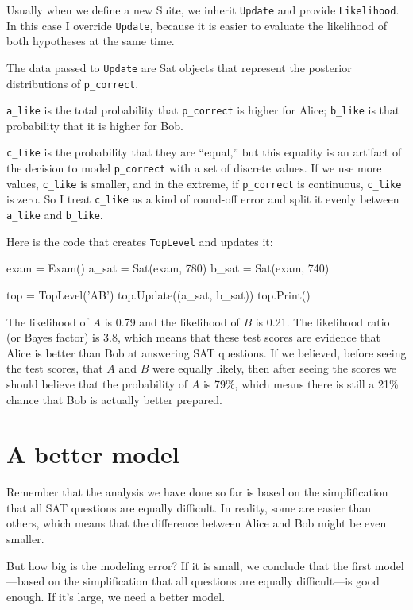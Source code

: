 \documentclass[12pt]{book}
\theoremstyle{exercise}
\begin{document}
Usually when we define a new Suite, we inherit {\tt Update}
and provide {\tt Likelihood}.  In this case I override {\tt Update},
because it is easier to evaluate the likelihood of both
hypotheses at the same time.

The data passed to {\tt Update} are Sat objects that represent
the posterior distributions of \verb"p_correct".

\verb"a_like" is the total probability that
\verb"p_correct" is higher for Alice; \verb"b_like" is that
probability that it is higher for Bob.

\verb"c_like" is the probability that they are ``equal,'' but this
equality is an artifact of the decision to model \verb"p_correct" with
a set of discrete values.  If we use more values, \verb"c_like"
is smaller, and in the extreme, if \verb"p_correct" is
continuous, \verb"c_like" is zero.  So I treat \verb"c_like" as
a kind of round-off error and split it evenly between \verb"a_like"
and \verb"b_like".

Here is the code that creates {\tt TopLevel} and updates it:

\begin{code}
    exam = Exam()
    a_sat = Sat(exam, 780)
    b_sat = Sat(exam, 740)

    top = TopLevel('AB')
    top.Update((a_sat, b_sat))
    top.Print()
\end{code}

The likelihood of $A$ is 0.79 and the likelihood of $B$ is 0.21.  The
likelihood ratio (or Bayes factor) is 3.8, which means that these test
scores are evidence that Alice is better than Bob at answering SAT
questions.  If we believed, before seeing the test scores, that $A$
and $B$ were equally likely, then after seeing the scores we should
believe that the probability of $A$ is 79\%, which means there is
still a 21\% chance that Bob is actually better prepared.


\section{A better model}

Remember that the analysis we have done so far is based on
the simplification that all SAT questions are equally difficult.
In reality, some are easier than others, which means that the
difference between Alice and Bob might be even smaller.

But how big is the modeling error?  If it is small, we conclude
that the first model---based on the simplification that all questions
are equally difficult---is good enough.  If it's large,
we need a better model.
\end{document}
